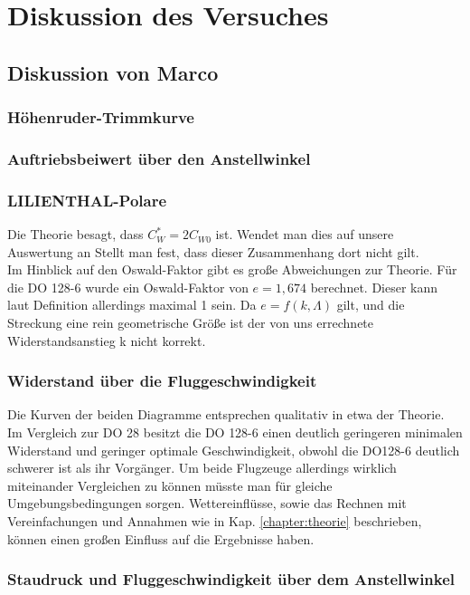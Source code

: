 \chapter{Diskussion des Versuches}
\label{chapter:fazit}
\section{Diskussion von Marco}
\subsection{Höhenruder-Trimmkurve}

\subsection{Auftriebsbeiwert über den Anstellwinkel}
\subsection{LILIENTHAL-Polare}
Die Theorie besagt, dass $C_{W}^{*} = 2C_{W0}$ ist. Wendet man dies auf unsere Auswertung an Stellt man fest, dass dieser Zusammenhang dort nicht gilt. \\
Im Hinblick auf den Oswald-Faktor gibt es große Abweichungen zur Theorie. Für die DO 128-6 wurde ein Oswald-Faktor von $e=1,674$ berechnet. Dieser kann laut Definition allerdings maximal 1 sein. Da $e=f(k, \Lambda)$ gilt, und die Streckung eine rein geometrische Größe ist der von uns errechnete Widerstandsanstieg k nicht korrekt. 
\subsection{Widerstand über die Fluggeschwindigkeit}
Die Kurven der beiden Diagramme entsprechen qualitativ in etwa der Theorie. Im Vergleich zur DO 28 besitzt die DO 128-6 einen deutlich geringeren minimalen Widerstand und geringer optimale Geschwindigkeit, obwohl die DO128-6 deutlich schwerer ist als ihr Vorgänger. Um beide Flugzeuge allerdings wirklich miteinander Vergleichen zu können müsste man für gleiche Umgebungsbedingungen sorgen. Wettereinflüsse, sowie das Rechnen mit Vereinfachungen und Annahmen wie in Kap. \ref{chapter:theorie} beschrieben, können einen großen Einfluss auf die Ergebnisse haben.
\subsection{Staudruck und Fluggeschwindigkeit über dem Anstellwinkel}
\newpage

